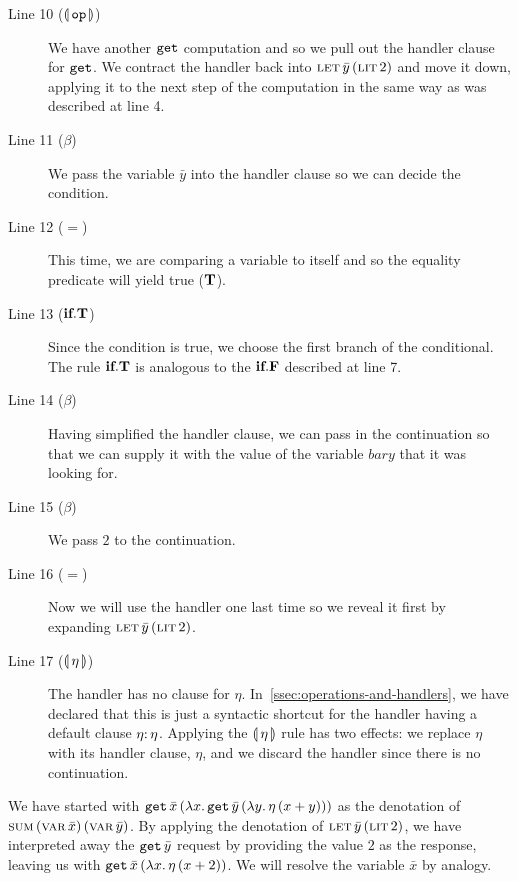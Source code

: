 \begin{description}
  \item[Line 10 ($\llparenthesis \, \mathtt{op} \, \rrparenthesis$)] We have another $\mathtt{get}$
    computation and so we pull out the handler clause for $\mathtt{get}$. We
    contract the handler back into $\textsc{let}\,\bar{y}\,(\textsc{lit}\,2)$ and
    move it down, applying it to the next step of the computation in the
    same way as was described at line 4.

  \item[Line 11 ($\beta$)] We pass the variable $\bar{y}$ into the
    handler clause so we can decide the condition.

  \item[Line 12 ($=$)] This time, we are comparing a variable to itself and
    so the equality predicate will yield true ($\textbf{T}$).

  \item[Line 13 ($\textbf{if}.\textbf{T}$)] Since the condition is true, we
    choose the first branch of the conditional. The rule
    $\textbf{if}.\textbf{T}$ is analogous to the $\textbf{if}.\textbf{F}$ described
    at line 7.

  \item[Line 14 ($\beta$)] Having simplified the handler clause, we can
    pass in the continuation so that we can supply it with the value of the
    variable $bar{y}$ that it was looking for.

  \item[Line 15 ($\beta$)] We pass $2$ to the continuation.

  \item[Line 16 ($=$)] Now we will use the handler one last time so we
    reveal it first by expanding $\textsc{let}\,\bar{y}\,(\textsc{lit}\,2)$.

  \item[Line 17 ($\llparenthesis \, \eta \, \rrparenthesis$)] The handler has no clause for
    $\eta$. In~\ref{ssec:operations-and-handlers}, we have declared that
    this is just a syntactic shortcut for the handler having a default
    clause $\onto{\eta}{\eta}$. Applying the $\llparenthesis \, \eta \, \rrparenthesis$ rule has two
    effects: we replace $\eta$ with its handler clause, $\eta$, and we
    discard the handler since there is no continuation.
\end{description}

We have started with $\mathtt{get}\,\bar{x}\,(\lambda x.\, \mathtt{get}\,\bar{y}\,(\lambda y.\, \eta\,(x + y)))$ as the
denotation of $\textsc{sum}\,(\textsc{var}\,\bar{x})\,(\textsc{var}\,\bar{y})$. By applying the denotation
of $\textsc{let}\,\bar{y}\,(\textsc{lit}\,2)$, we have interpreted away the
$\mathtt{get}\,\bar{y}$ request by providing the value $2$ as the
response, leaving us with $\mathtt{get}\,\bar{x}\,(\lambda x.\, \eta\,(x +
      2))$. We will resolve the variable $\bar{x}$ by analogy.

